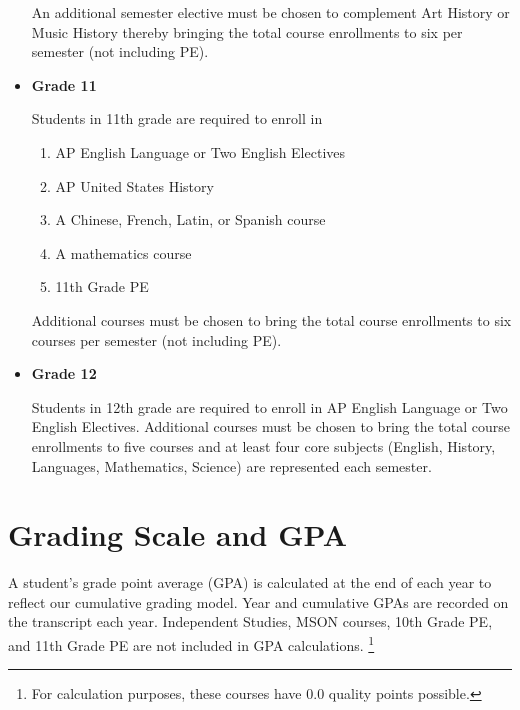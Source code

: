 \begin{itemize}
  An additional semester elective must be chosen to complement Art History or Music History thereby bringing the total course enrollments to six per semester (not including PE).
  
  \item[] \textbf{Grade 11}
  
  Students in 11th grade are required to enroll in 
\begin{enumerate}\itemsep=0mm
    \item AP English Language or Two English Electives
    \item AP United States History
    \item A Chinese, French, Latin, or Spanish course 
    \item A mathematics course
    \item 11th Grade PE
  \end{enumerate}
  
  Additional courses must be chosen to bring the total course enrollments to six courses per semester (not including PE).
  
  \item[] \textbf{Grade 12    }
  
  Students in 12th grade are required to enroll in AP English Language or Two English Electives.  Additional courses must be chosen to bring the total course enrollments to five courses and at least four core subjects (English, History, Languages, Mathematics, Science) are represented each semester.

\end{itemize}

\section{Grading Scale and GPA}

A student’s grade point average (GPA) is calculated at the end of each year to reflect our cumulative grading model. Year and cumulative GPAs are recorded on the transcript each year.  Independent Studies, MSON courses, 10th Grade PE, and 11th Grade PE are not included in GPA calculations. \footnote{For calculation purposes, these courses have $0.0$ quality points possible.}

